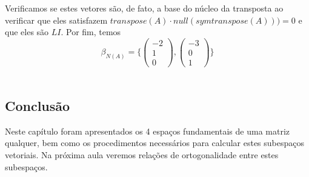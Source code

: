 \documentclass[12pt]{article}
\begin{document}
Verificamos se estes vetores são, de fato, a base do núcleo da transposta ao verificar que eles satisfazem $transpose(A)\cdot null(symtranspose(A)))=0$ e que eles são $LI$. Por fim, temos
\begin{equation*}
	\beta_{N(A)}= \{
	\begin{pmatrix}
		-2\\
		1\\
		0
	\end{pmatrix},
	\begin{pmatrix}
		-3\\
		0\\
		1
	\end{pmatrix}	\}
\end{equation*}\\

\subsection{Conclusão}
Neste capítulo foram apresentados os 4 espaços fundamentais de uma matriz qualquer, bem como os procedimentos necessários para calcular estes subespaços vetoriais. Na próxima aula veremos relações de ortogonalidade entre estes subespaços.
\end{document}
